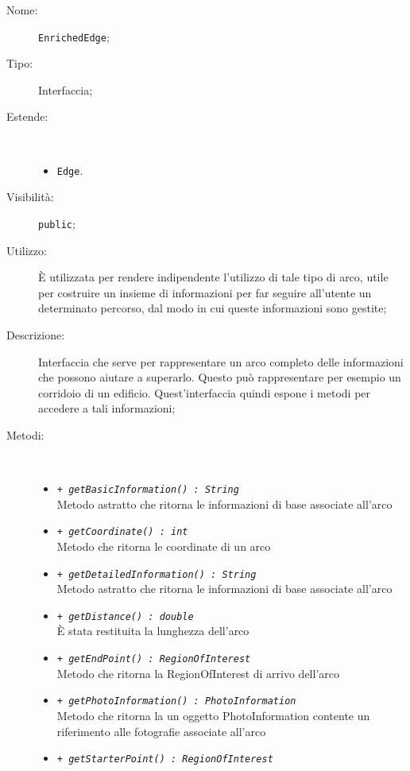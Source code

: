 \documentclass[../DefinizioneDiProdotto.tex]{subfiles}
\begin{document}
\begin{description}
	\item[Nome:] \texttt{EnrichedEdge};
	\item[Tipo:] Interfaccia;
	\item[Estende:] \
	\begin{itemize}
		\item \texttt{Edge}.
		
	\end{itemize}
	\item[Visibilità:] \texttt{public};
	\item[Utilizzo:] È utilizzata per rendere indipendente l'utilizzo di tale tipo di arco, utile per costruire un insieme di informazioni per far seguire all'utente un determinato percorso, dal modo in cui queste informazioni sono gestite;
	\item[Descrizione:] Interfaccia che serve per rappresentare un arco completo delle informazioni che possono aiutare a superarlo. Questo può rappresentare per esempio un corridoio di un edificio. Quest'interfaccia quindi espone i metodi per accedere a tali informazioni;
	\item[Metodi:] \
	\begin{itemize}
		\item \texttt{+ \textit{getBasicInformation() : String}}\\
		Metodo astratto che ritorna le informazioni di base associate all'arco
		\item \texttt{+ \textit{getCoordinate() : int}}\\
		Metodo che ritorna le coordinate di un arco
		\item \texttt{+ \textit{getDetailedInformation() : String}}\\
		Metodo astratto che ritorna le informazioni di base associate all'arco
		\item \texttt{+ \textit{getDistance() : double}}\\
		È stata restituita la lunghezza dell'arco 
		\item \texttt{+ \textit{getEndPoint() : RegionOfInterest}}\\
		Metodo che ritorna la RegionOfInterest di arrivo dell'arco
		\item \texttt{+ \textit{getPhotoInformation() : PhotoInformation}}\\
		Metodo che ritorna la un oggetto PhotoInformation contente un riferimento alle fotografie associate all'arco
		\item \texttt{+ \textit{getStarterPoint() : RegionOfInterest}}\\

\end{itemize}
\end{description}
\end{document}
